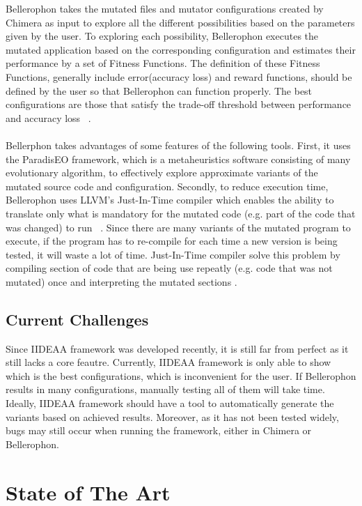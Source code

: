 Bellerophon takes the mutated files and mutator configurations created by Chimera as input to explore all the different possibilities based on the parameters given by the user. To exploring each possibility, Bellerophon executes the mutated application based on the corresponding configuration and estimates their performance by a set of Fitness Functions. The definition of these Fitness Functions, generally include error(accuracy loss) and reward functions, should be defined by the user so that Bellerophon can function properly. The best configurations are those that satisfy the trade-off threshold between performance and accuracy loss ~\cite{iideaa}. \\
~\\
Bellerphon takes advantages of some features of the following tools. First, it uses the ParadisEO framework, which is a metaheuristics software consisting of many evolutionary algorithm, to effectively explore approximate variants of the mutated source code and configuration. Secondly, to reduce execution time, Bellerophon uses LLVM's Just-In-Time compiler which enables the ability to translate only what is mandatory for the mutated code (e.g. part of the code that was changed) to run ~\cite{iideaa}. Since there are many variants of the mutated program to execute, if the program has to re-compile for each time a new version is being tested, it will waste a lot of time. Just-In-Time compiler solve this problem by compiling section of code that are being use repeatly (e.g. code that was not mutated) once and interpreting the mutated sections \cite{JIT}. \\

\subsection{Current Challenges}
Since IIDEAA framework was developed recently, it is still far from perfect as it still lacks a core feautre. Currently, IIDEAA framework is only able to show which is the best configurations, which is inconvenient for the user. If Bellerophon results in many configurations, manually testing all of them will take time. Ideally, IIDEAA framework should have a tool to automatically generate the variants based on achieved results. Moreover, as it has not been tested widely, bugs may still occur when running the framework, either in Chimera or Bellerophon. \\

\section{State of The Art}

